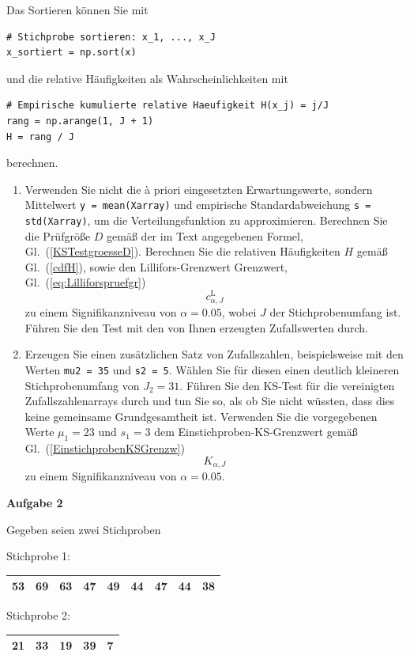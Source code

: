 Das Sortieren können Sie mit
\begin{lstlisting}[style=Python]
# Stichprobe sortieren: x_1, ..., x_J
x_sortiert = np.sort(x)
\end{lstlisting}
und die relative Häufigkeiten als Wahrscheinlichkeiten mit
\begin{lstlisting}[style=Python]
# Empirische kumulierte relative Haeufigkeit H(x_j) = j/J
rang = np.arange(1, J + 1)
H = rang / J
\end{lstlisting}
berechnen.

\begin{enumerate}
\item Verwenden Sie nicht die {\`a} priori eingesetzten Erwartungswerte,
 sondern Mittelwert \texttt{y = mean(Xarray)} und empirische Standardabweichung
 \texttt{s = std(Xarray)}, um die Verteilungsfunktion zu approximieren. Berechnen Sie die
 Prüfgröße $D$ gemäß der im Text angegebenen Formel, Gl.\ (\ref{KSTestgroesseD}). Berechnen Sie die 
 relativen Häufigkeiten $H$ gemäß Gl.~(\ref{cdfH}), sowie den Lillifors-Grenzwert 
 Grenzwert, Gl.\ (\ref{eq:Lilliforspruefgr})
  $$c_{\alpha,J}^{\mathrm L}$$
 zu einem Signifikanzniveau von $\alpha = 0.05$,
 wobei $J$ der Stichprobenumfang ist.
 Führen Sie den Test mit den von Ihnen erzeugten Zufallswerten durch.
\item Erzeugen Sie einen zusätzlichen Satz von Zufallszahlen, beispielsweise mit den
 Werten \texttt{mu2 = 35} und \texttt{s2 = 5}. Wählen Sie für diesen einen
 deutlich kleineren Stichprobenumfang von $J_2 = 31$. Führen Sie den KS-Test für die
 vereinigten Zufallszahlenarrays durch und tun Sie so, als ob Sie nicht
 wüssten, dass dies keine gemeinsame Grundgesamtheit ist. Verwenden Sie die 
 vorgegebenen Werte $\mu_1 = 23$ und $s_1 = 3$ dem Einstichproben-KS-Grenzwert gemäß Gl.~(\ref{EinstichprobenKSGrenzw})
 $$K_{\alpha, J}$$
 zu einem Signifikanzniveau von $\alpha = 0.05$.
\end{enumerate}


\textbf{Aufgabe 2}

Gegeben seien zwei Stichproben

Stichprobe 1:

\begin{tabular}{|c|c|c|c|c|c|c|c|c|}
\hline
53 & 69 & 63 & 47 & 49 & 44 & 47 & 44 & 38\\
\hline
\end{tabular}

Stichprobe 2:

\begin{tabular}{|c|c|c|c|c|}
\hline
21 & 33 & 19 & 39 & 7\\
\hline
\end{tabular}


